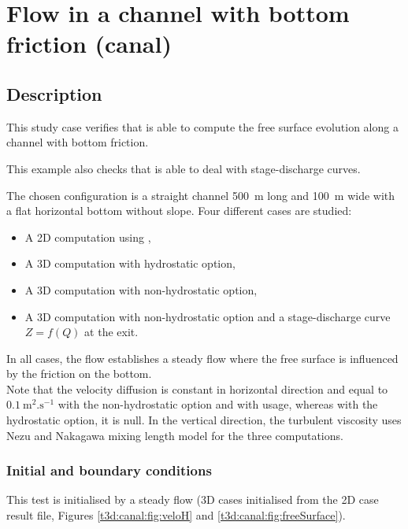 \chapter{Flow in a channel with bottom friction (canal)}

\section{Description}
\bigskip
This study case verifies that  is able to compute the free
surface evolution along a channel with bottom friction.

This example also checks that  is able to deal with stage-discharge
curves.

\bigskip
The chosen configuration is a straight channel 500~m long and 100~m wide
with a flat horizontal bottom without slope.
Four different cases are studied:
\begin{itemize}
\item A 2D computation using ,
\item A 3D computation with hydrostatic option,
\item A 3D computation with non-hydrostatic option,
\item A 3D computation with non-hydrostatic option and
a stage-discharge curve $Z = f(Q)$ at the exit.
\end{itemize}
In all cases, the flow establishes a steady flow where the free surface
is influenced by the friction on the bottom. \\
Note that the velocity diffusion is constant in horizontal direction
and equal to $0.1~\text{m}^2.\text{s}^{-1}$ with the non-hydrostatic 
option and with  usage, whereas with the hydrostatic option, 
it is null. In the vertical direction, the turbulent viscosity uses 
Nezu and Nakagawa mixing length model for the three  computations.

\subsection{Initial and boundary conditions}

\bigskip
This test is initialised by a steady flow (3D cases initialised 
from the 2D case result file, Figures 
\ref{t3d:canal:fig:veloH} and \ref{t3d:canal:fig:freeSurface}).

